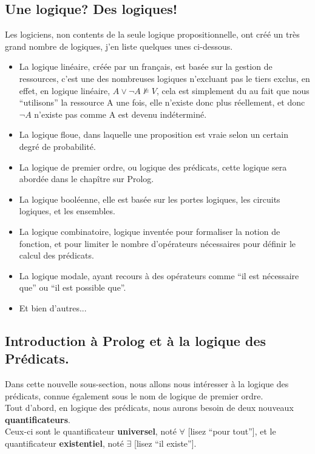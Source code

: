 \documentclass[a4paper, 12pt]{article}
\numberwithin{equation}{subsection}
\begin{document}
\subsection{Une logique? Des logiques!}
Les logiciens, non contents de la seule logique propositionnelle, ont créé un très grand nombre de logiques, j'en liste quelques unes ci-dessous.
\begin{itemize}
  \item La logique linéaire, créée par un français, est basée sur la gestion de ressources, c'est une des nombreuses logiques n'excluant pas le tiers exclus, en effet, en logique linéaire, $A \lor \neg A \nvDash V$, cela est simplement du au fait que nous ``utilisons'' la ressource A une fois, elle n'existe donc plus réellement, et donc $\neg A$ n'existe pas comme A est devenu indéterminé.
  \item La logique floue, dans laquelle une proposition est vraie selon un certain degré de probabilité.
  \item La logique de premier ordre, ou logique des prédicats, cette logique sera abordée dans le chapître sur Prolog.
  \item La logique booléenne, elle est basée sur les portes logiques, les circuits logiques, et les ensembles.
  \item La logique combinatoire, logique inventée pour formaliser la notion de fonction, et pour limiter le nombre d'opérateurs nécessaires pour définir le calcul des prédicats.
  \item La logique modale, ayant recours à des opérateurs comme ``il est nécessaire que'' ou ``il est possible que''.
  \item Et bien d'autres...
\end{itemize}
\subsection{Introduction à Prolog et à la logique des Prédicats.}
Dans cette nouvelle sous-section, nous allons nous intéresser à la logique des prédicats, connue également sous le nom de logique de premier ordre. \\

Tout d'abord, en logique des prédicats, nous aurons besoin de deux nouveaux {\bf quantificateurs}. \\

Ceux-ci sont le quantificateur {\bf universel}, noté $\forall$ [lisez ``pour tout''], et le quantificateur {\bf existentiel}, noté $\exists$ [lisez ``il existe'']. \\
\end{document}
